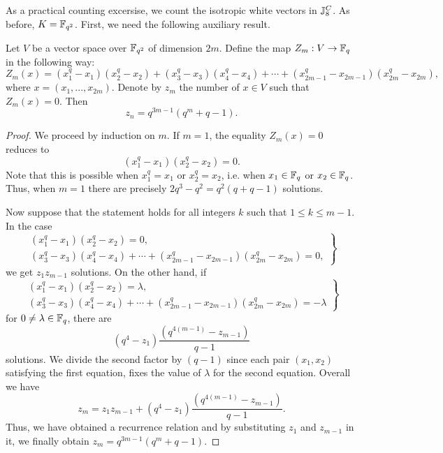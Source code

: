 As a practical counting excersise, we count the isotropic white vectors in $\mathbb{J}_{8}^{C}$.
As before, $K = \mathbb{F}_{q^2}$. First, we need the following auxiliary result.

\begin{lemma}
		\label{lemma:zn}
		Let $V$ be a vector space over $\mathbb{F}_{q^2}$ of dimension $2m$. 
		Define the map $Z_m: V \rightarrow \mathbb{F}_q$ in the following way:
		\begin{equation*}
			Z_m(x) = (x_1^q - x_1) (x_2^q - x_2) + (x_3^q - x_3) (x_4^q - x_4) + \cdots +
			(x_{2m-1}^q-x_{2m-1}) (x_{2m}^q - x_{2m}),
		\end{equation*}
		where $x = (x_1, ..., x_{2m})$. 
		Denote by $z_m$ the number of $x\in V$ such that $Z_m(x) = 0$. Then
		\begin{equation*}
			z_n = q^{3m-1}(q^m+q-1).
		\end{equation*}
\end{lemma}

\begin{proof}
		We proceed by induction on $m$. If $m=1$, the equality $Z_m(x)=0$ reduces to
		\begin{equation*}
			(x_1^q - x_1) (x_2^q - x_2) = 0.
		\end{equation*}
		Note that this is possible when $x_1^q = x_1$ or $x_2^q = x_2$, i.e. when
		$x_1 \in \mathbb{F}_q$ or $x_2 \in \mathbb{F}_q$. Thus, when $m=1$ there are precisely
		$2q^3-q^2 = q^2(q+q-1)$ solutions.

		Now suppose that the statement holds for all integers $k$ such that
		$1 \leqslant k \leqslant m-1$. In the case
		\begin{equation*}
			\left.
			\begin{array}{l}
				(x_1^q - x_1) (x_2^q - x_2) = 0, \\
				(x_3^q - x_3) (x_4^q - x_4) + \cdots + 
					(x_{2m-1}^q-x_{2m-1}) (x_{2m}^q - x_{2m}) = 0,
			\end{array}
			\right\}
		\end{equation*}
		we get $z_1 z_{m-1}$ solutions. On the other hand, if
		\begin{equation*}
			\left.
			\begin{array}{l}
				(x_1^q - x_1) (x_2^q - x_2) = \lambda, \\
				(x_3^q - x_3) (x_4^q - x_4) + \cdots + (x_{2m-1}^q-x_{2m-1})
						(x_{2m}^q - x_{2m}) = -\lambda
			\end{array}
			\right\}
		\end{equation*}
		for $0\neq \lambda \in \mathbb{F}_q$, there are 
		\begin{equation*}
			(q^4-z_1) \frac{(q^{4(m-1)}-z_{m-1})}{q-1}
		\end{equation*}
		solutions.
		We divide the second factor by $(q-1)$ since each pair $(x_1,x_2)$ satisfying the
		first equation, fixes the value of $\lambda$ for the second equation. Overall we have
		\begin{equation*}
			z_m = z_1 z_{m-1} + (q^4-z_1) \frac{(q^{4(m-1)}-z_{m-1})}{q-1}.
		\end{equation*}
		Thus, we have obtained a recurrence relation and by substituting $z_1$ and $z_{m-1}$ in
		it, we finally obtain $z_m = q^{3m-1}(q^m+q-1)$.
\end{proof}

